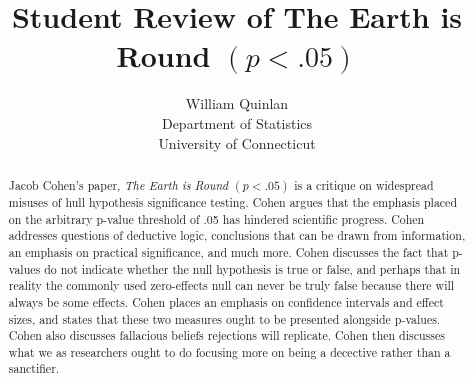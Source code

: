 \documentclass[12pt]{article}
\title{Student Review of The Earth is Round $(p < .05)$}
\author{William Quinlan\\
  Department of Statistics\\
  University of Connecticut
}
\begin{document}
\maketitle

\begin{abstract}
Jacob Cohen's paper, \textit{The Earth is Round $(p < .05)$} is a critique on widespread misuses of hull hypothesis significance testing. Cohen argues that the emphasis placed on the arbitrary p-value threshold of .05 has hindered scientific progress. Cohen addresses questions of deductive logic, conclusions that can be drawn from information, an emphasis on practical significance, and much more. Cohen discusses the fact that p-values do not indicate whether the null hypothesis is true or false, and perhaps that in reality the commonly used zero-effects null can never be truly false because there will always be some effects. Cohen places an emphasis on confidence intervals and effect sizes, and states that these two measures ought to be presented alongside p-values. Cohen also discusses fallacious beliefs rejections will replicate. Cohen then discusses what we as researchers ought to do focusing more on being a decective rather than a sanctifier. 

\end{abstract}

\doublespacing




\end{document}
